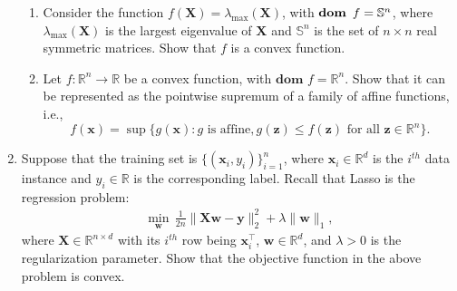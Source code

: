 \documentclass[11pt,letter,notitlepage]{article}
\DeclareMathOperator*{\dom}{\bf dom\,}
\begin{document}
\begin{exercise}
\begin{enumerate}
\begin{enumerate}
            
            \item
            Consider the function $f(\mathbf{X})=\lambda_{\max}(\mathbf{X})$, with $\dom\, f =\mathbb{S}^n$, where $\lambda_{\max}(\mathbf{X})$ is the largest eigenvalue of $\mathbf{X}$ and $\mathbb{S}^n$ is the set of $n\times n$ real symmetric matrices. Show that $f$ is a convex function.
            \item
            Let $f:\mathbb{R}^n\to\mathbb{R}$ be a convex function, with $\textbf{dom }f=\mathbb{R}^n$. Show that it can be represented as the pointwise supremum of a family of affine functions, i.e.,
            $$
            f(\mathbf{x})=\sup\{ g(\mathbf{x}): g\text{ is affine},g(\mathbf{z})\le f(\mathbf{z}) \text{ for all }\mathbf{z}\in\mathbb{R}^n\}.
            $$
        \end{enumerate}
        \item 
        Suppose that the training set is $\{(\mathbf{x}_i,y_i)\}_{i=1}^n$, where $\mathbf{x}_i\in\mathbb{R}^d$ is the $i^{th}$ data instance and $y_i\in\mathbb{R}$ is the corresponding label.
        Recall that Lasso is the regression problem:
        	\begin{align*}
            	\min_{\mathbf{w}}\,\frac{1}{2n}\|\mathbf{X}\mathbf{w}-\mathbf{y}\|_2^2+\lambda\|\mathbf{w}\|_1,
            \end{align*}
        	where $\mathbf{X}\in\mathbb{R}^{n\times d}$ with its $i^{th}$ row being $\mathbf{x}_i^{\top}$, $\mathbf{w} \in \mathbb{R}^d$, and $\lambda>0$ is the regularization parameter. Show that the objective function in the above problem is convex.
    	
    \end{enumerate}
\end{exercise}
\begin{solution}

\end{solution}
\end{document}

